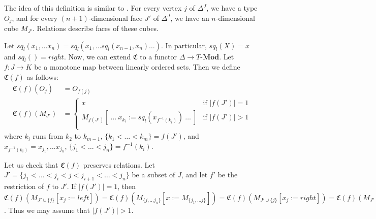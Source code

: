 \documentclass[reqno]{amsart}
\theoremstyle{definition}
\theoremstyle{remark}
\newcommand{\repl}{:=}
\newcommand{\cat}[1]{\mathbf{#1}}
\newcommand{\Mod}[1]{#1\text{-}\cat{Mod}}
\numberwithin{figure}{section}
\begin{document}
The idea of this definition is similar to \cite[Definition~1.1.5.1]{lurie-topos}.
For every vertex $j$ of $\Delta^J$, we have a type $O_j$,
and for every $(n+1)$-dimensional face $J'$ of $\Delta^J$, we have an $n$-dimensional cube $M_{J'}$.
Relations describe faces of these cubes.

Let $sq_l(x_1, \ldots x_n) = sq_l(x_1, \ldots sq_l(x_{n-1},x_n) \ldots )$.
In particular, $sq_l(X) = x$ and $sq_l() = right$.
Now, we can extend $\mathfrak{C}$ to a functor $\Delta \to \Mod{T}$.
Let $f : J \to K$ be a monotone map between linearly ordered sets.
Then we define $\mathfrak{C}(f)$ as follows:
\begin{align*}
\mathfrak{C}(f)(O_j) & = O_{f(j)} \\
\mathfrak{C}(f)(M_{J'}) & =
\begin{cases}
    x                                                                  & \text{if } |f(J')| = 1 \\
    M_{f(J')}[\ \ldots\ x_{k_i} \repl sq_l(x_{f^{-1}(k_i)})\ \ldots\ ] & \text{if } |f(J')| > 1 \\
  \end{cases}
\end{align*}
where $k_i$ runs from $k_2$ to $k_{m-1}$, $\{ k_1 < \ldots < k_m \} = f(J')$,
and $x_{f^{-1}(k_i)} = x_{j_1}, \ldots x_{j_n}$, $\{ j_1 < \ldots < j_n \} = f^{-1}(k_i)$.

Let us check that $\mathfrak{C}(f)$ preserves relations.
Let $J' = \{ j_1 < \ldots < j_i < j < j_{i+1} < \ldots < j_n \}$ be a subset of $J$, and let $f'$ be the restriction of $f$ to $J'$.
If $|f(J')| = 1$, then $\mathfrak{C}(f)(M_{J' \cup \{j\}}[x_j \repl left]) = \mathfrak{C}(f)(M_{\{ j, \ldots j_n \}}[x \repl M_{\{ j_1, \ldots j \}}]) = \mathfrak{C}(f)(M_{J' \cup \{j\}}[x_j \repl right]) = \mathfrak{C}(f)(M_{J'}) = x$.
Thus we may assume that $|f(J')| > 1$. 
\end{document}
